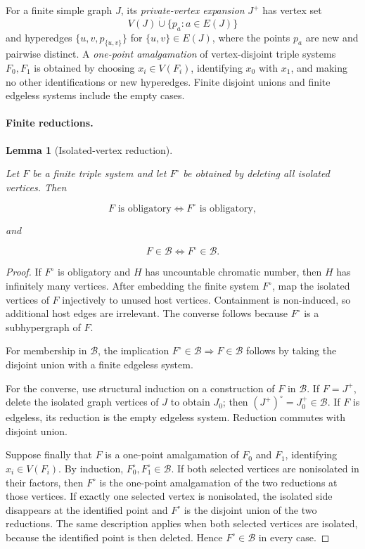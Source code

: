 \documentclass[a4paper,11pt,reqno]{amsart}
\theoremstyle{plain}
\newtheorem{lemma}[theorem]{Lemma}
\theoremstyle{definition}
\theoremstyle{remark}
\begin{document}
For a finite simple graph \(J\), its \emph{private-vertex expansion} \(J^+\) has vertex set
\[
V(J)\mathbin{\dot\cup}\{p_a:a\in E(J)\}
\]
and hyperedges \(\{u,v,p_{\{u,v\}}\}\) for \(\{u,v\}\in E(J)\), where the points \(p_a\) are new and pairwise distinct. A \emph{one-point amalgamation} of vertex-disjoint triple systems \(F_0,F_1\) is obtained by choosing \(x_i\in V(F_i)\), identifying \(x_0\) with \(x_1\), and making no other identifications or new hyperedges. Finite disjoint unions and finite edgeless systems include the empty cases.

\paragraph{Finite reductions.}\label{finite-reductions}

\begin{lemma}[Isolated-vertex reduction]\label{lemma-1.1-isolated-vertex-reduction}

Let \(F\) be a finite triple system and let \(F^\circ\) be obtained by deleting all isolated vertices. Then

\[
F\text{ is obligatory}\iff F^\circ\text{ is obligatory},
\]

and

\[
F\in\mathcal B\iff F^\circ\in\mathcal B.
\]

\end{lemma}
\begin{proof}
If \(F^\circ\) is obligatory and \(H\) has uncountable chromatic number, then \(H\) has infinitely many vertices. After embedding the finite system \(F^\circ\), map the isolated vertices of \(F\) injectively to unused host vertices. Containment is non-induced, so additional host edges are irrelevant. The converse follows because \(F^\circ\) is a subhypergraph of \(F\).

For membership in \(\mathcal B\), the implication \(F^\circ\in\mathcal B\Rightarrow F\in\mathcal B\) follows by taking the disjoint union with a finite edgeless system.

For the converse, use structural induction on a construction of \(F\) in \(\mathcal B\). If \(F=J^+\), delete the isolated graph vertices of \(J\) to obtain \(J_0\); then \((J^+)^\circ=J_0^+\in\mathcal B\). If \(F\) is edgeless, its reduction is the empty edgeless system. Reduction commutes with disjoint union.

Suppose finally that \(F\) is a one-point amalgamation of \(F_0\) and
\(F_1\), identifying \(x_i\in V(F_i)\). By induction,
\(F_0^\circ,F_1^\circ\in\mathcal B\). If both selected vertices are
nonisolated in their factors, then \(F^\circ\) is the one-point amalgamation
of the two reductions at those vertices. If exactly one selected vertex is
nonisolated, the isolated side disappears at the identified point and
\(F^\circ\) is the disjoint union of the two reductions. The same description
applies when both selected vertices are isolated, because the identified
point is then deleted. Hence \(F^\circ\in\mathcal B\) in every case.
\end{proof}
\end{document}
